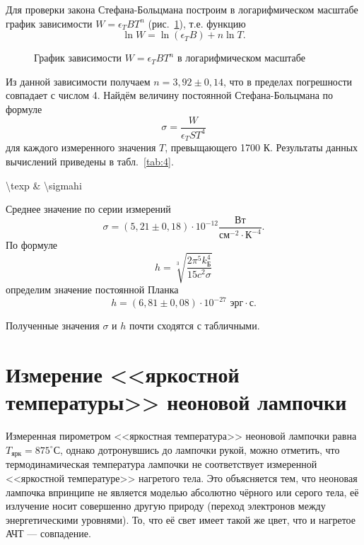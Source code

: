 \documentclass[a4paper]{article}
\begin{document}
Для проверки закона Стефана-Больцмана построим в логарифмическом
масштабе график зависимости $W=\epsilon_T B T^n$ (рис.~\ref{fig:3}), т.\:е.
функцию
\[
	\ln W=\ln(\epsilon_T B)+n \ln T
.\]
\begin{figure}[htpb]
	\centering
	\caption{График зависимости $W=\epsilon_T B T^n$ в 
	логарифмическом масштабе}
	\label{fig:3}
\end{figure}Из данной зависимости получаем $n=3,92\pm 0,14$, что в пределах
погрешности совпадает с числом 4.
Найдём величину постоянной Стефана-Больцмана по формуле
\[
\sigma= \frac{W}{\epsilon_T S T^4}
\]
для каждого измеренного значения $T$, превыщающего 1700 К.
Результаты данных вычислений приведены в табл.~\ref{tab:4}.
	\begin{table}[htpb]
		\centering
		\caption{}
		\label{tab:4}
		{\num{\texp} & \num{\sigmahi}}
	\end{table}
	Среднее значение по серии измерений \[\sigma=(5,21\pm 0,18)\cdot 10^{-12}\frac{\text{Вт}}{\text{см}^{-2}\cdot \text{К}^{-4}}.\]
По формуле
\[
	h= \sqrt[3]{\frac{2 \pi^5 k_\text{Б}^4}{15c^2\sigma}} 
\]
определим значение постоянной Планка \[h=(6,81\pm 0,08)\cdot
10^{-27} \text{ эрг}\cdot\text{с}.\]

Полученные значения $\sigma$ и $h$ почти сходятся с табличными.
\section{Измерение <<яркостной температуры>> неоновой
лампочки}
Измеренная пирометром <<яркостная температура>> неоновой лампочки
равна $T_\text{ярк}=875^\circ$С, однако дотронувшись до лампочки
рукой, можно отметить, что термодинамическая температура
лампочки не соответствует измеренной <<яркостной температуре>>
нагретого тела. Это объясняется тем, что неоновая лампочка
впринципе не является моделью абсолютно чёрного или серого тела, её
излучение носит совершенно другую природу (переход электронов
между энергетическими уровнями). То, что её свет имеет такой
же цвет, что и нагретое АЧТ --- совпадение.
\end{document}
